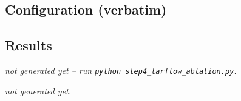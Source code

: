 \documentclass[11pt]{article}
\begin{document}
\subsection{Configuration (verbatim)}
{\small}

\subsection{Results}
\begin{center}
  {\emph{not generated yet -- run \texttt{python step4\_tarflow\_ablation.py}.}}
\end{center}

  {\emph{not generated yet.}}
\clearpage
\end{document}
